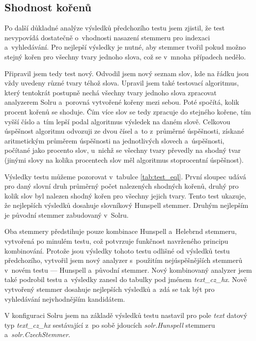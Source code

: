 \subsection{Shodnost kořenů}
Po další důkladné analýze výsledků předchozího testu jsem zjistil, že test nevypovídá dostatečně o~vhodnosti nasazení stemmeru pro indexaci a~vyhledávání. Pro nejlepší výsledky je nutné, aby stemmer tvořil pokud možno stejný kořen pro všechny tvary jednoho slova, což se v~mnoha případech nedělo.

Připravil jsem tedy test nový. Odvodil jsem nový seznam slov, kde na řádku jsou vždy uvedeny různé tvary téhož slova. Upravil jsem také testovací algoritmus, který tentokrát postupně nechá všechny tvary jednoho slova zpracovat analyzerem Solru a~porovná vytvořené kořeny mezi sebou. Poté spočítá, kolik procent kořenů se shoduje. Čím více slov se tedy zpracuje do stejného kořene, tím vyšší číslo a~tím lepší podal algoritmus výsledek na daném slově. Celkovou úspěšnost algoritmu odvozuji ze dvou čísel a~to z~průměrné úspěšnosti, získané aritmetickým průměrem úspěšnosti na jednotlivých slovech a~úspěšnosti, počítané jako procento slov, u~nichž se všechny tvary převedly na shodný tvar (jinými slovy na kolika procentech slov měl algoritmus stoprocentní úspěšnost).

Výsledky testu můžeme pozorovat v~tabulce \ref{tab:test_eql}. První sloupec udává pro daný slovní druh průměrný počet nalezených shodných kořenů, druhý pro kolik slov byl nalezen shodný kořen pro všechny jejich tvary. Tento test ukazuje, že nejlepších výsledků dosahuje slovníkový Hunspell stemmer. Druhým nejlepším je původní stemmer zabudovaný v~Solru.

Oba stemmery předstihuje pouze kombinace Hunspell a~Helebrnd stemmeru, vytvořená po minulém testu, což potvrzuje funkčnost navrženého principu kombinování. Protože jsou výsledky tohoto testu odlišné od výsledků testu předchozího, vytvořil jsem nový analyzer s~použitím nejúspěšnějších stemmerů v~novém testu --- Hunspell a~původní stemmer. Nový kombinovaný analyzer jsem také podrobil testu a~výsledky zanesl do tabulky pod jménem \emph{text\_cz\_hx}. Nově vytvořený stemmer dosahuje nejlepších výsledků a~zdá se tak být pro vyhledávání nejvhodnějším kandidátem.

V konfiguraci Solru jsem na základě výsledků testu nastavil pro pole \emph{text} datový typ \emph{text\_cz\_hx} sestávající z~po sobě jdoucích \emph{solr.Hunspell} stemmeru a~\emph{solr.CzechStemmer}.

